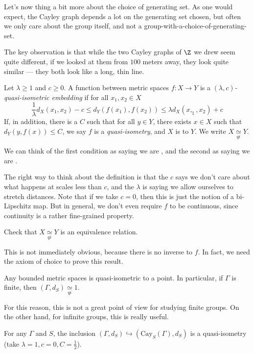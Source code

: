 \documentclass[a4paper]{article}
\newcommand\Cay{\mathrm{Cay}}
\newcommand{\qi}{\underset{qi}{\simeq}}
\begin{document}
Let's now thing a bit more about the choice of generating set. As one would expect, the Cayley graph depends a lot on the generating set chosen, but often we only care about the group itself, and not a group-with-a-choice-of-generating-set.

The key observation is that while the two Cayley graphs of $\Z$ we drew seem quite different, if we looked at them from $100$ meters away, they look quite similar --- they both look like a long, thin line.

\begin{defi}
  Let $\lambda \geq 1$ and $c \geq 0$. A function between metric spaces $f: X \to Y$ is a \emph{$(\lambda, c)$-quasi-isometric embedding} if for all $x_1, x_2 \in X$
  \[
    \frac{1}{\lambda} d_X(x_1, x_2) - c \leq d_Y(f(x_1), f(x_2)) \leq \lambda d_X(x,_1, x_2) + c
  \]
  If, in addition, there is a $C$ such that for all $y \in Y$, there exists $x \in X$ such that $d_Y(y, f(x)) \leq C$, we say $f$ is a \emph{quasi-isometry}, and $X$ is  to $Y$. We write $X\qi Y$.
\end{defi}
We can think of the first condition as saying we are , and the second as saying we are .

The right way to think about the definition is that the $c$ says we don't care about what happens at scales less than $c$, and the $\lambda$ is saying we allow ourselves to stretch distances. Note that if we take $c = 0$, then this is just the notion of a bi-Lipschitz map. But in general, we don't even require $f$ to be continuous, since continuity is a rather fine-grained property.

\begin{ex}
  Check that $X\qi Y$ is an equivalence relation.
\end{ex}
This is not immediately obvious, because there is no inverse to $f$. In fact, we need the axiom of choice to prove this result.

\begin{eg}
  Any bounded metric spaces is quasi-isometric to a point. In particular, if $\Gamma$ is finite, then $(\Gamma, d_S) \qi 1$.
\end{eg}
For this reason, this is not a great point of view for studying finite groups. On the other hand, for infinite groups, this is really useful.

\begin{eg}
  For any $\Gamma$ and $S$, the inclusion $(\Gamma, d_S)\hookrightarrow (\Cay_S(\Gamma), d_S)$ is a quasi-isometry (take $\lambda = 1, c = 0, C = \frac{1}{2}$).
\end{eg}
\end{document}
